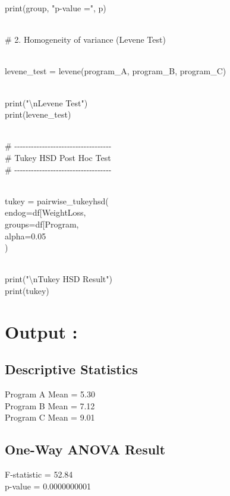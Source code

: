 \documentclass[
]{article}
\begin{document}
print(group, "p-value =", p)\\
\strut \\
\# 2. Homogeneity of variance (Levene Test)\\
\strut \\
levene\_test = levene(program\_A, program\_B, program\_C)\\
\strut \\
print("\textbackslash nLevene Test")\\
print(levene\_test)\\
\strut \\
\#
-\/-\/-\/-\/-\/-\/-\/-\/-\/-\/-\/-\/-\/-\/-\/-\/-\/-\/-\/-\/-\/-\/-\/-\/-\/-\/-\/-\/-\/-\/-\/-\/-\/-\/-\\
\# Tukey HSD Post Hoc Test\\
\#
-\/-\/-\/-\/-\/-\/-\/-\/-\/-\/-\/-\/-\/-\/-\/-\/-\/-\/-\/-\/-\/-\/-\/-\/-\/-\/-\/-\/-\/-\/-\/-\/-\/-\/-\\
\strut \\
tukey = pairwise\_tukeyhsd(\\
endog=df{[}\textquotesingle WeightLoss\textquotesingle{]},\\
groups=df{[}\textquotesingle Program\textquotesingle{]},\\
alpha=0.05\\
)\\
\strut \\
print("\textbackslash nTukey HSD Result")\\
print(tukey)

\section{\texorpdfstring{\textbf{Output :}}{Output :}}\label{output-4}

\subsection{Descriptive Statistics}\label{descriptive-statistics}

Program A Mean = 5.30\\
Program B Mean = 7.12\\
Program C Mean = 9.01

\subsection{One-Way ANOVA Result}\label{one-way-anova-result}

F-statistic = 52.84\\
p-value = 0.0000000001
\end{document}
